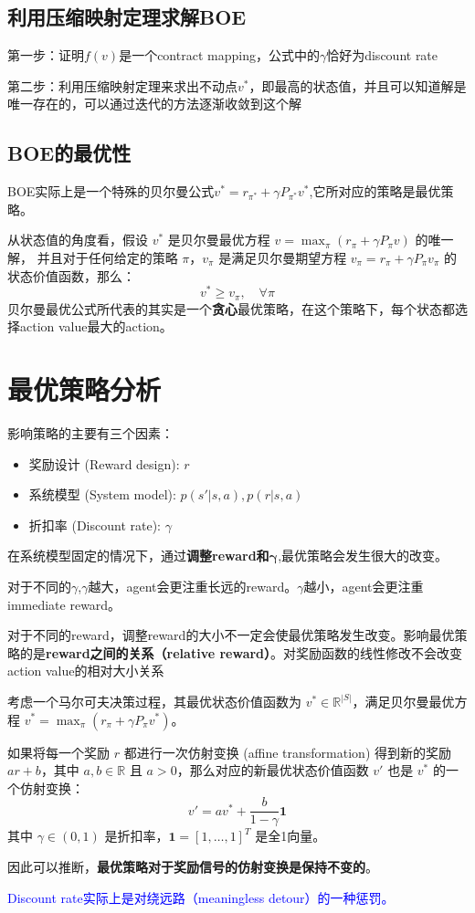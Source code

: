 \documentclass{article}
\begin{document}
\subsection{利用压缩映射定理求解BOE}
第一步：证明$f(v)$是一个contract mapping，公式中的$\gamma$恰好为discount rate

第二步：利用压缩映射定理来求出不动点$v^*$，即最高的状态值，并且可以知道解是唯一存在的，可以通过迭代的方法逐渐收敛到这个解
\subsection{BOE的最优性}
BOE实际上是一个特殊的贝尔曼公式$v^* = r_{\pi^*} + \gamma P_{\pi^*} v^*$,它所对应的策略是最优策略。

从状态值的角度看，假设 $v^*$ 是贝尔曼最优方程 $v = \max_{\pi} (r_{\pi} + \gamma P_{\pi} v)$ 的唯一解，
并且对于任何给定的策略 $\pi$，$v_\pi$ 是满足贝尔曼期望方程 $v_{\pi} = r_{\pi} + \gamma P_{\pi} v_{\pi}$ 的状态价值函数，那么：
\[
v^* \ge v_{\pi}, \quad \forall \pi
\]
贝尔曼最优公式所代表的其实是一个\textbf{贪心}最优策略，在这个策略下，每个状态都选择action value最大的action。
\section{最优策略分析}
影响策略的主要有三个因素：
\begin{itemize}
    \item 奖励设计 (Reward design): $r$
    \item 系统模型 (System model): $p(s'|s, a), p(r|s, a)$
    \item 折扣率 (Discount rate): $\gamma$
\end{itemize}
在系统模型固定的情况下，通过\textbf{调整reward和$\bm{\gamma}$},最优策略会发生很大的改变。

对于不同的$\gamma$,$\gamma$越大，agent会更注重长远的reward。$\gamma$越小，agent会更注重immediate reward。

对于不同的reward，调整reward的大小不一定会使最优策略发生改变。影响最优策略的是\textbf{reward之间的关系（relative reward）}。对奖励函数的线性修改不会改变action value的相对大小关系

{ %
\kaishu
考虑一个马尔可夫决策过程，其最优状态价值函数为 $v^* \in \mathbb{R}^{|S|}$，满足贝尔曼最优方程 $v^* = \max_{\pi} (r_{\pi} + \gamma P_{\pi} v^*)$。

如果将每一个奖励 $r$ 都进行一次仿射变换 (affine transformation) 得到新的奖励 $ar+b$，其中 $a, b \in \mathbb{R}$ 且 $a > 0$，那么对应的新最优状态价值函数 $v'$ 也是 $v^*$ 的一个仿射变换：
\[
v' = av^* + \frac{b}{1-\gamma} \mathbf{1}
\]
其中 $\gamma \in (0, 1)$ 是折扣率，$\mathbf{1} = [1, \dots, 1]^T$ 是全1向量。

因此可以推断，\textbf{最优策略对于奖励信号的仿射变换是保持不变的}。
}

\textcolor{blue}{\kaishu*Discount rate实际上是对绕远路（meaningless detour）的一种惩罚。}
\end{document}
